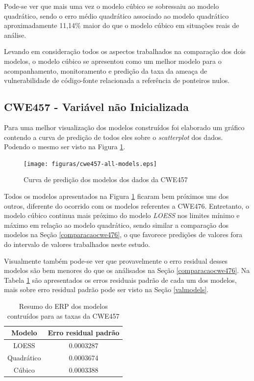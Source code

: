 Pode-se ver que mais uma vez o modelo cúbico se sobressaiu ao modelo quadrático,
sendo o erro médio quadrático associado ao modelo quadrático aproximadamente
11,14\% maior do que o modelo cúbico em situações reais de análise.

Levando em consideração todos os aspectos trabalhados na comparação dos dois
modelos, o modelo cúbico se apresentou como um melhor modelo para o
acompanhamento, monitoramento e predição da taxa da ameaça de vulnerabilidade de
código-fonte relacionada a referência de ponteiros nulos.

\subsection{CWE457 - Variável não Inicializada}

Para uma melhor visualização dos modelos construídos foi elaborado um gráfico
contendo a curva de predição de todos eles sobre o \textit{scatterplot} dos
dados. Podendo o mesmo ser visto na Figura \ref{fig:cwe457-all-models}.

\begin{figure}[h]
  \centering
  \texttt{[image: figuras/cwe457-all-models.eps]}
      \caption{Curva de predição dos modelos dos dados da CWE457}
  \label{fig:cwe457-all-models}
\end{figure}

Todos os modelos apresentados na Figura \ref{fig:cwe457-all-models} ficaram bem
próximos uns dos outros, diferente do ocorrido com os modelos referentes a
CWE476. Entretanto, o modelo cúbico continua mais próximo do modelo
\textit{LOESS} nos limites mínimo e máximo em relação ao modelo quadrático,
sendo similar a comparação dos modelos na Seção \ref{comparacaocwe476}, o que
favorece predições de valores fora do intervalo de valores trabalhados neste
estudo.

Visualmente também pode-se ver que provavelmente o erro residual desses modelos
são bem menores do que os análisados na Seção \ref{comparacaocwe476}. Na Tabela
\ref{tab:cwe457-erros} são apresentados os erros residuais padrão de cada um dos
modelos, mais sobre erro residual padrão pode ser visto na Seção \ref{valmodels}.

\begin{table}[h]
 \centering
 \begin{tabular}{cc}
  \hline
  \rowcolor[HTML]{EFEFEF} 
  {Modelo} & {Erro residual padrão} \\ \hline
  {LOESS}  & 0.0003287                  \\ \hline
  Quadrático   & 0.0003674                  \\ \hline
  Cúbico       & 0.0003388                 \\ \hline
 \end{tabular}
 \caption{Resumo do ERP dos modelos contruídos para as taxas da CWE457}
 \label{tab:cwe457-erros}
\end{table}

